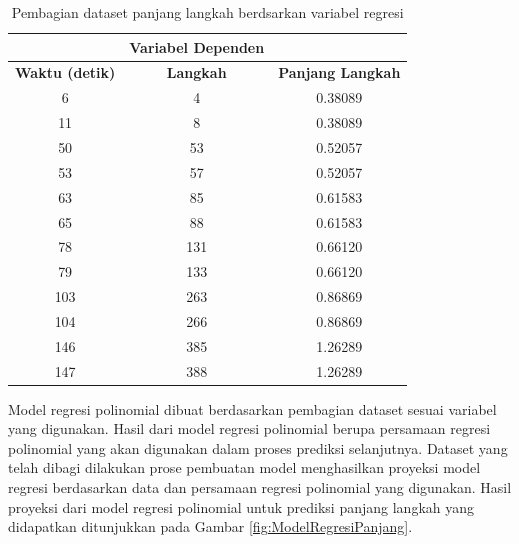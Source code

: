 \begin{longtable}{|c|c|c|}
  \caption{Pembagian dataset panjang langkah berdsarkan variabel regresi}
  \label{tb:VariabelPrediksiPanjang}                                   \\
  \hline
  \rowcolor[HTML]{C0C0C0}
  \multicolumn{2}{|c|}{\textbf{Variabel Independen}}  & \textbf{Variabel Dependen}  \\
  \hline
  \rowcolor[HTML]{C0C0C0}
  \textbf{Waktu (detik)} & \textbf{Langkah} & \textbf{Panjang Langkah} \\
  \hline
  6    & 4    & 0.38089      \\
  \hline
  11    & 8    & 0.38089     \\
  \hline
  50    & 53    & 0.52057     \\
  \hline
  53    & 57    & 0.52057     \\
  \hline
  63    & 85    & 0.61583     \\
  \hline
  65    & 88    & 0.61583     \\
  \hline
  78    & 131    & 0.66120     \\
  \hline
  79    & 133    & 0.66120     \\
  \hline
  103    & 263    & 0.86869     \\
  \hline
  104    & 266    & 0.86869     \\
  \hline
  146    & 385    & 1.26289     \\
  \hline
  147    & 388    & 1.26289     \\
  \hline
\end{longtable}

Model regresi polinomial dibuat berdasarkan pembagian dataset sesuai variabel yang digunakan. Hasil dari model regresi polinomial berupa persamaan regresi polinomial yang akan digunakan dalam proses prediksi selanjutnya. Dataset yang telah dibagi dilakukan prose pembuatan model menghasilkan proyeksi model regresi berdasarkan data dan persamaan regresi polinomial yang digunakan. Hasil proyeksi dari model regresi polinomial untuk prediksi panjang langkah yang didapatkan ditunjukkan pada Gambar \ref{fig:ModelRegresiPanjang}.

